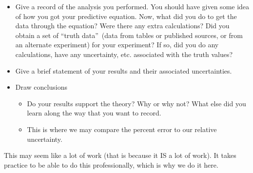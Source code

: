 \begin{itemize}
\item Give a record of the analysis you performed. You should have given
some idea of how you got your predictive equation. Now, what did you do to
get the data through the equation? Were there any extra calculations? Did
you obtain a set of \textquotedblleft truth data\textquotedblright\ (data
from tables or published sources, or from an alternate experiment) for your experiment? If so, did you do any calculations, have any uncertainty, etc. associated with the truth values?

\item Give a brief statement of your results and their associated
uncertainties.

\item Draw conclusions

\begin{itemize}
\item Do your results support the theory? Why or why not? What else did you learn along the way that you want to record.

\item This is where we may compare the percent error to our relative
uncertainty.
\end{itemize}
\end{itemize}

This may seem like a lot of work (that is because it IS a lot of work). It
takes practice to be able to do this professionally, which is why we do it
here.
